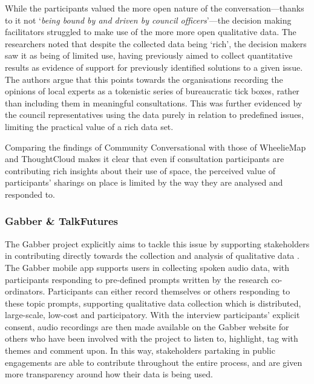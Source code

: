 While the participants valued the more open nature of the conversation---thanks to it not `\textit{being bound by and driven by council officers}'---the decision making facilitators struggled to make use of the more more open qualitative data. The researchers noted that despite the collected data being `rich', the decision makers saw it as being of limited use, having previously aimed to collect quantitative results as evidence of support for previously identified solutions to a given issue. The authors argue that this points towards the organisations recording the opinions of local experts as a tokenistic series of bureaucratic tick boxes, rather than including them in meaningful consultations. This was further evidenced by the council representatives using the data purely in relation to predefined issues, limiting the practical value of a rich data set. 

Comparing the findings of Community Conversational with those of WheelieMap and ThoughtCloud makes it clear that even if consultation participants are contributing rich insights about their use of space, the perceived value of participants' sharings on place is limited by the way they are analysed and responded to.

\subsubsection{Gabber \& TalkFutures}
The Gabber project explicitly aims to tackle this issue by supporting stakeholders in contributing directly towards the collection and analysis of qualitative data \citep{Rainey2019}. The Gabber mobile app supports users in collecting spoken audio data, with participants responding to pre-defined prompts written by the research co-ordinators. Participants can either record themselves or others responding to these topic prompts, supporting qualitative data collection which is distributed, large-scale, low-cost and participatory. With the interview participants' explicit consent, audio recordings are then made available on the Gabber website for others who have been involved with the project to listen to, highlight, tag with themes and comment upon. In this way, stakeholders partaking in public engagements are able to contribute throughout the entire process, and are given more transparency around how their data is being used.

